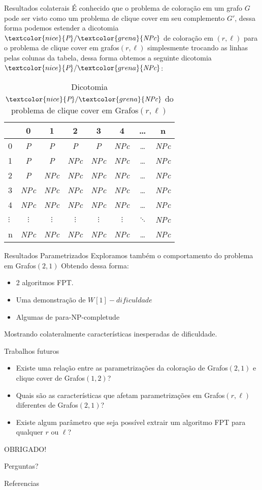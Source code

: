 \documentclass[9pt, compress]{beamer}
\renewcommand{\P}{\textcolor{nice}{\textit{P}}}
\newcommand{\NPc}{\textcolor{grena}{\textit{NPc}}}
\newcommand{\?}{\textcolor{warn}{\textit{?}}}
\begin{document}
     \begin{frame}{Resultados colaterais}
      É conhecido que o problema de coloração em um grafo $G$ pode ser visto como um problema de clique cover em seu complemento $G'$\cite{gareyjohnson}, dessa forma podemos estender a dicotomia $\P/\NPc$ de coloração em $(r,\ell)$ para o problema de clique cover em grafos$(r,\ell)$ simplesmente trocando as linhas pelas colunas da tabela, dessa forma obtemos a seguinte dicotomia $\P/\NPc$:
\begin{table}[!htb]
	\center
	\begin{tabular}{l|*{7}c}
		\toprule
		\backslashbox{$r$}{$l$} & 0 & 1 & 2 & 3 & 4 & \ldots & n\\
		\midrule
		0 & \P & \P & \P & \P & \NPc & \ldots & \NPc\\
		1 & \P & \P & \NPc & \NPc & \NPc & \ldots & \NPc\\
		2 & \P & \NPc & \NPc & \NPc & \NPc & \ldots & \NPc\\
		3 & \NPc & \NPc & \NPc & \NPc & \NPc & \ldots & \NPc\\
		4 & \NPc & \NPc & \NPc & \NPc & \NPc & \ldots & \NPc\\
		$\vdots$ & $\vdots$ & $\vdots$ & $\vdots$ & $\vdots$ & $\vdots$ & $\ddots$ & \NPc\\
		n & \NPc & \NPc & \NPc & \NPc & \NPc & \ldots & \NPc\\
		\bottomrule
	\end{tabular}%
	\caption{Dicotomia $\P/\NPc$ do problema de clique cover em Grafos$(r,\ell)$}%
\end{table}%
     \end{frame}
     \begin{frame}{Resultados Parametrizados}
       Exploramos também o comportamento do problema em Grafos$(2,1)$ Obtendo dessa forma:
       \begin{itemize}
         \item 2 algoritmos FPT.
         \item Uma demonstração de $W[1]-dificuldade$
         \item Algumas de para-NP-completude
       \end{itemize}
        Mostrando colateralmente características inesperadas de dificuldade.
     \end{frame}
     \begin{frame}{Trabalhos futuros}
       \begin{itemize}
  \item Existe uma relação entre as parametrizações da coloração de Grafos$(2,1)$ e clique cover de Grafos$(1,2)$?
  \item Quais são as características que afetam parametrizações em Grafos$(r,\ell)$ diferentes de Grafos$(2,1)$?
  \item Existe algum parâmetro que seja possível extrair um algoritmo FPT para qualquer $r$ ou $\ell$?
\end{itemize}
     \end{frame}
     \begin{frame}[standout]
       OBRIGADO!
       
       Perguntas?
     \end{frame}
     \begin{frame}{Referencias}
       
       
     \end{frame}
\end{document}
